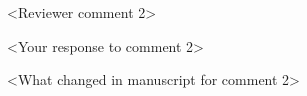 \begin{commentresponse}
  {\begin{revcomment}
    <Reviewer comment 2>
  \end{revcomment}}
  {\begin{response}
    <Your response to comment 2>
  \end{response}}
  {\begin{changes}
    <What changed in manuscript for comment 2>


  \end{changes}}
\end{commentresponse}


\clearpage
